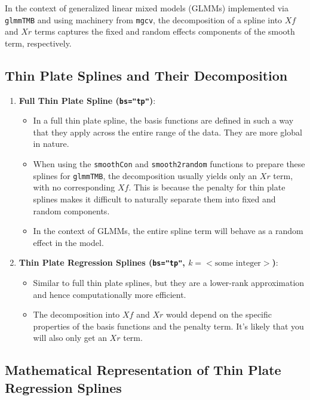 \documentclass{article}
\begin{document}
In the context of generalized linear mixed models (GLMMs) implemented via \texttt{glmmTMB} and using machinery from \texttt{mgcv}, the decomposition of a spline into \(Xf\) and \(Xr\) terms captures the fixed and random effects components of the smooth term, respectively.

\subsection{Thin Plate Splines and Their Decomposition}

\begin{enumerate}
    \item \textbf{Full Thin Plate Spline (\texttt{bs="tp"})}:
    \begin{itemize}
        \item In a full thin plate spline, the basis functions are defined in such a way that they apply across the entire range of the data. They are more global in nature.
        \item When using the \texttt{smoothCon} and \texttt{smooth2random} functions to prepare these splines for \texttt{glmmTMB}, the decomposition usually yields only an \(Xr\) term, with no corresponding \(Xf\). This is because the penalty for thin plate splines makes it difficult to naturally separate them into fixed and random components.
        \item In the context of GLMMs, the entire spline term will behave as a random effect in the model.
    \end{itemize}
    
    \item \textbf{Thin Plate Regression Splines (\texttt{bs="tp"}, \(k=<\text{some integer}>\))}:
    \begin{itemize}
        \item Similar to full thin plate splines, but they are a lower-rank approximation and hence computationally more efficient.
        \item The decomposition into \(Xf\) and \(Xr\) would depend on the specific properties of the basis functions and the penalty term. It's likely that you will also only get an \(Xr\) term.
    \end{itemize}
\end{enumerate}


\subsection{Mathematical Representation of Thin Plate Regression Splines}
\end{document}
